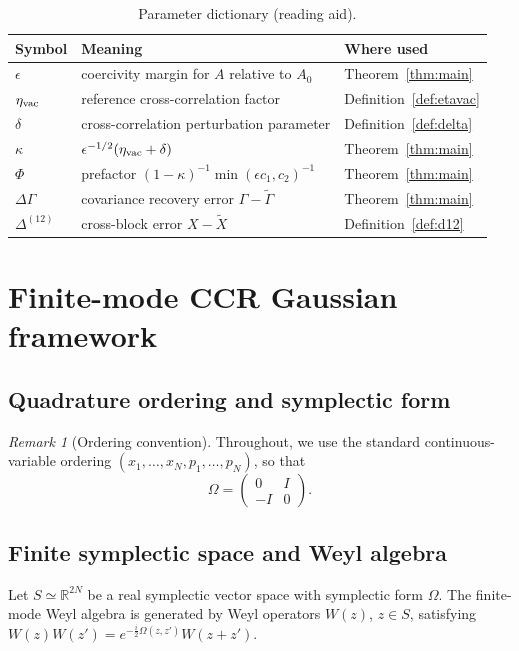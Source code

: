 \documentclass[11pt]{article}
\theoremstyle{remark}
\newtheorem{remark}[theorem]{Remark}
\begin{document}
\begin{table}[h]
\centering
\caption{Parameter dictionary (reading aid).}
\begin{tabular}{lll}
\hline
Symbol & Meaning & Where used \\
\hline
$\epsilon$ & coercivity margin for $A$ relative to $A_0$ & Theorem~\ref{thm:main} \\
$\eta_{\rm vac}$ & reference cross-correlation factor & Definition~\ref{def:etavac} \\
$\delta$ & cross-correlation perturbation parameter & Definition~\ref{def:delta} \\
$\kappa$ & $\epsilon^{-1/2}(\eta_{\rm vac} + \delta)$ & Theorem~\ref{thm:main} \\
$\Phi$ & prefactor $(1-\kappa)^{-1}\min(\epsilon c_1, c_2)^{-1}$ & Theorem~\ref{thm:main} \\
$\Delta\Gamma$ & covariance recovery error $\Gamma - \tilde\Gamma$ & Theorem~\ref{thm:main} \\
$\Delta^{(12)}$ & cross-block error $X - \tilde X$ & Definition~\ref{def:d12} \\
\hline
\end{tabular}
\end{table}

\section{Finite-mode CCR Gaussian framework}

\subsection{Quadrature ordering and symplectic form}
\begin{remark}[Ordering convention]
Throughout, we use the standard continuous-variable ordering
$(x_1,\dots,x_N,p_1,\dots,p_N)$, so that
\[
\Omega = \begin{pmatrix} 0 & I \\ -I & 0 \end{pmatrix}.
\]
\end{remark}

\subsection{Finite symplectic space and Weyl algebra}
Let $S \simeq \mathbb{R}^{2N}$ be a real symplectic vector space with
symplectic form $\Omega$. The finite-mode Weyl algebra is generated by Weyl
operators $W(z)$, $z \in S$, satisfying
$W(z)W(z') = e^{-\frac{i}{2}\Omega(z,z')} W(z+z')$.
\end{document}
